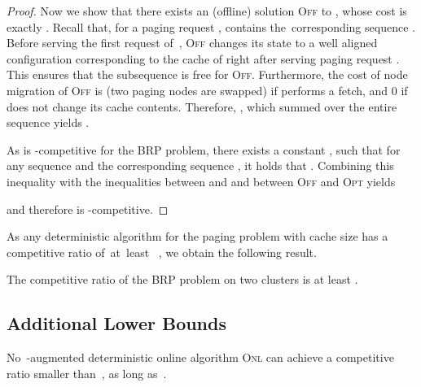 \documentclass{siamart190516}
\newcommand{\ONL}{\textsc{Onl}\xspace}
\newcommand{\OFF}{\textsc{Off}\xspace}
\newcommand{\OPT}{\textsc{Opt}\xspace}
\begin{document}
\begin{proof}
Now we show that there exists an (offline) solution \OFF to , whose
cost is exactly . Recall that, for a
paging request ,  contains the~corresponding sequence
. Before serving the first request
of~, \OFF changes its state to a well aligned
configuration corresponding to the cache of  right after serving paging
request . This ensures that the subsequence 
is free for \OFF. Furthermore, the cost of node migration of \OFF is  (two paging nodes are swapped) if  performs a fetch, and 0 if
 does not change its cache contents. Therefore,
, which
summed over the entire sequence  yields .

As  is -competitive for the BRP problem, there exists a constant
, such that for any sequence  and the corresponding sequence
, it holds that . Combining this inequality with the inequalities between  and 
and between \OFF and \OPT yields

and therefore  is -competitive.
\end{proof}

As any deterministic algorithm for the paging problem with cache size 
has a competitive ratio of~at~least ~\cite{SleTar85}, we obtain the
following result.

\begin{corollary}
The competitive ratio of the BRP problem on two clusters is at least . 
\end{corollary}


\subsection{Additional Lower Bounds}
\label{sec:lower-bounds}

\begin{theorem}\label{thm:loweraugmk}
No~-augmented deterministic online algorithm \ONL
can achieve a competitive ratio smaller than~, as long as~.
\end{theorem}
\end{document}
